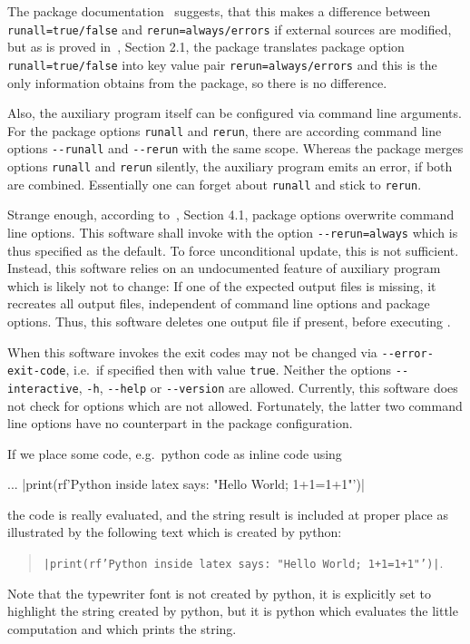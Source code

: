 The package documentation~\cite{PythonTexP} suggests, 
that this makes a difference between \texttt{runall=true/false} 
and \texttt{rerun=always/errors} if external sources are modified, 
but as is proved in~\cite{PyTexInOut}, Section 2.1, 
the package translates package option \texttt{runall=true/false} into key value pair \texttt{rerun=always/errors} 
and this is the only information  obtains from the package, 
so there is no difference. 

Also, the auxiliary program  itself can be configured via command line arguments. 
For the package options \texttt{runall} and \texttt{rerun}, 
there are according command line options \texttt{-{}-runall} and \texttt{-{}-rerun} with the same scope. 
Whereas the package merges options \texttt{runall} and \texttt{rerun} silently, 
the auxiliary program  emits an error, if both are combined. 
Essentially one can forget about \texttt{runall} and stick to \texttt{rerun}. 

Strange enough, according to~\cite{PythonTexP}, Section 4.1, package options overwrite command line options. 
This software shall invoke  
with the option \texttt{-{}-rerun=always} which is thus specified as the default. 
To force unconditional update, this is not sufficient. 
Instead, this software relies on an undocumented feature of auxiliary program  
which is likely not to change: 
If one of the expected output files is missing, 
it recreates all output files, independent of command line options and package options. 
Thus, this software deletes one output file if present, 
before executing . 

When this software invokes  
the exit codes may not be changed via \texttt{-{}-error-exit-code}, 
i.e.~if specified then with value \texttt{true}. 
Neither the options \texttt{-{}-interactive}, \texttt{-h}, \texttt{-{}-help} or \texttt{-{}-version} are allowed. 
Currently, this software does not check for options which are not allowed. 
Fortunately, the latter two command line options have no counterpart in the package configuration. 




If we place some code, e.g.~python code as inline code using 
%
\begin{taglstlisting}[basicstyle=\footnotesize]
  \usepackage[depythontex]{pythontex}
  ...
  \pyc|print(rf'Python inside latex says: "Hello World; 1+1={1+1}"')|
\end{taglstlisting}
%
the code is really evaluated, and the string result is included at proper place 
as illustrated by the following text which is created by python: 
%
\begin{quote}
  \texttt{\pyc|print(rf'Python inside latex says: "Hello World; 1+1={1+1}"')|}. %
\end{quote}
%
Note that the typewriter font is not created by python, 
it is explicitly set to highlight the string created by python, 
but it is python which evaluates the little computation 
and which prints the string. 

